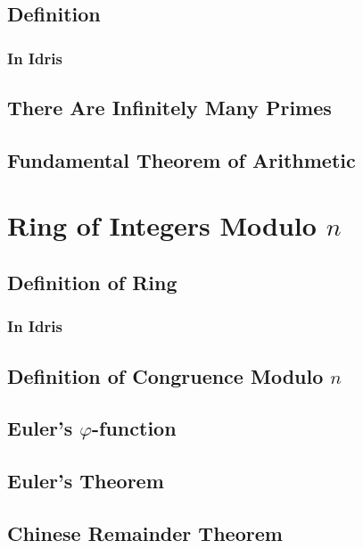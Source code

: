 \documentclass{article}
\begin{document}
\subsection{Definition}
\subsubsection{In Idris}

\subsection{There Are Infinitely Many Primes}

\subsection{Fundamental Theorem of Arithmetic}

\section{Ring of Integers Modulo $n$}
\subsection{Definition of Ring}
\subsubsection{In Idris}

\subsection{Definition of Congruence Modulo $n$}

\subsection{Euler's $\varphi$-function}

\subsection{Euler's Theorem}

\subsection{Chinese Remainder Theorem}

\section{}
\end{document}
